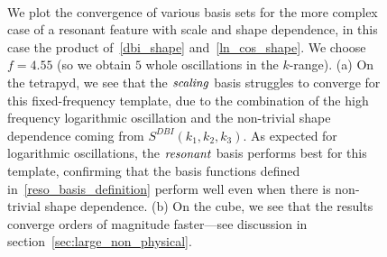 \begin{figure}[!pth]
\centering     %
\\
\caption{
    We plot the convergence of various basis sets for the more complex case of a resonant
    feature with scale and shape dependence, in this case the product of~\eqref{dbi_shape}
    and~\eqref{ln_cos_shape}.
    We choose $f=4.55$ (so we obtain $5$ whole oscillations in the $k$-range).
    (a) On the tetrapyd, we see that the $\textit{scaling}$ basis struggles to converge for this fixed-frequency
    template, due to the combination of the high frequency logarithmic oscillation
    and the non-trivial shape dependence coming from $S^{DBI}(k_1,k_2,k_3)$.
    As expected for logarithmic oscillations,
    the $\textit{resonant}$ basis performs best for this template, confirming that
    the basis functions defined in~\eqref{reso_basis_definition} perform well
    even when there is non-trivial shape dependence.
    (b) On the cube, we see that the results converge orders of magnitude faster---see
    discussion in section~\ref{sec:large_non_physical}.
}\label{fig:log_recon_osc_dbiosc}
\end{figure}

